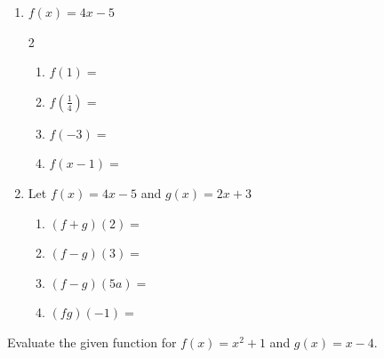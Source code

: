 \documentclass[12pt, twoside]{report}
\begin{document}
\begin{enumerate}
	\item \(f(x) = 4x - 5\) 
	\begin{multicols}{2}
		\begin{enumerate}
			\item
			\(f(1) =\) 
			\vskip0.5in
			
			\item 
			\(f\left( \frac{1}{4} \right) =\)  
			\vskip1in \null
			
			\item
			\(f( - 3) =\) 
			\vskip0.5in
			
			\item
			\(f(x - 1) =\) 
			\vskip1in \null 
		\end{enumerate}
	\end{multicols}
	
	
	\item Let \(f(x) = 4x - 5\) and \(g(x) = 2x + 3\) 
	
	\begin{enumerate}[resume]
		\item
		\((f + g)(2) =\) \vfill 
		\item $(f - g)(3) = $ \vfill 
		\item
		\((f - g)(5a) =\) \vfill 
		\item $(fg)( - 1) = $ \vfill 
	\end{enumerate}
	
\end{enumerate}


%
%    
%    





\pagebreak


  
  Evaluate the given function for \(f(x) = x^{2} + 1\) and \(g(x) = x - 4\).
  
\end{document}
